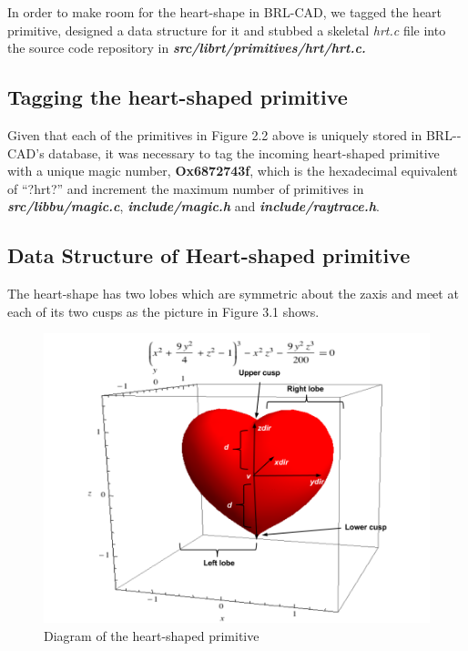 In   order   to   make   room   for   the   heart­-shape   in   BRL-­CAD,   we   tagged   the   heart  
primitive,   designed   a   data   structure   for   it   and   stubbed   a   skeletal   \textit{hrt.c}   file   into  
the source code repository in \textbf{\textit{src/librt/primitives/hrt/hrt.c.}}

\subsection{Tagging the heart­-shaped primitive}

Given   that   each   of   the   primitives   in   Figure   2.2   above   is   uniquely   stored   in  
BRL-­CAD's   database,   it   was   necessary   to   tag   the   incoming   heart-­shaped  
primitive   with   a   unique   magic   number,   \textbf{Ox6872743f},   which   is   the   hexadecimal  
equivalent   of   “?hrt?”   and   increment   the   maximum   number   of   primitives   in  
\textbf{\textit{src/libbu/magic.c}}, \textbf{\textit{include/magic.h}} and \textbf{\textit{include/raytrace.h}}.  

\subsection{Data Structure of Heart-shaped primitive }

\hspace{30} The   heart-­shape   has   two   lobes   which   are   symmetric   about   the   z­axis   and  
meet at each of its two cusps as the picture in Figure 3.1 shows.  

\begin{figure}[htbp]
\centering
\includegraphics[trim=0.0cm 0.5cm 0.1cm 0.1cm, clip=true, totalheight=0.4\textheight]{Pictures/Heart.png}
\caption[Diagram of the heart-shaped primitive]{Diagram of the heart-shaped primitive}
\label{Heart}
\end{figure}


